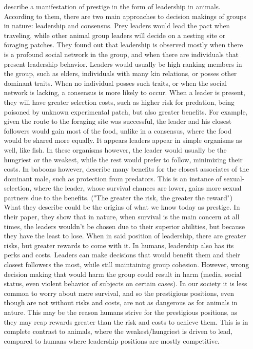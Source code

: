\documentclass[12pt]{extarticle}
\begin{document}
\citet{animal_leadership} describe a manifestation of prestige in the form of leadership in animals. According to them, there are two main approaches to decision makings of groups in nature: leadership and consensus. Prey leaders would lead the pact when traveling, while other animal group leaders will decide on a nesting site or foraging patches. They found out that leadership is observed mostly when there is a profound social network in the group, and when there are individuals that present leadership behavior. Leaders would usually be high ranking members in the group, such as elders, individuals with many kin relations, or posses other dominant traits. When no individual posses such traits, or when the social network is lacking, a consensus is more likely to occur.
When a leader is present, they will have greater selection costs, such as higher risk for predation, being poisoned by unknown experimental patch, but also greater benefits. For example, given the route to the foraging site was successful, the leader and his closest followers would gain most of the food, unlike in a consensus, where the food would be shared more equally.
It appears leaders appear in simple organisms as well, like fish. In these organisms however, the leader would usually be the hungriest or the weakest, while the rest would prefer to follow, minimizing their costs. In baboons however, \citet{animal_leadership} describe many benefits for the closest associates of the dominant male, such as protection from predators. This is an instance of sexual-selection, where the leader, whose survival chances are lower, gains more sexual partners due to the benefits. ("The greater the risk, the greater the reward")
What they describe could be the origins of what we know today as prestige. In their paper, they show that in nature, when survival is the main concern at all times, the leaders wouldn't be chosen due to their superior abilities, but because they have the least to lose. When in said position of leadership, there are greater risks, but greater rewards to come with it. 
In humans, leadership also has its perks and costs. Leaders can make decisions that would benefit them and their closest followers the most, while still maintaining group cohesion. However, wrong decision making that would harm the group could result in harm (media, social status, even violent behavior of subjects on certain cases).
In our society it is less common to worry about mere survival, and so the prestigious positions, even though are not without risks and costs, are not as dangerous as for animals in nature. This may be the reason humans strive for the prestigious positions, as they may reap rewards greater than the risk and costs to achieve them. This is in complete contrast to animals, where the weakest/hungriest is driven to lead, compared to humans where leadership positions are mostly competitive.\\
\end{document}
